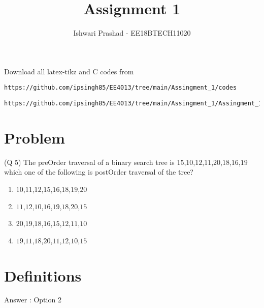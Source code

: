 \documentclass[journal,12pt,twocolumn]{IEEEtran}
\begin{document}
     \def\rightbox#1{\makebox[0in][r]{#1}}
     \def\centbox#1{\makebox[0in]{#1}}
     \def\topbox#1{\raisebox{-\baselineskip}[0in][0in]{#1}}
     \def\midbox#1{\raisebox{-0.5\baselineskip}[0in][0in]{#1}}
\vspace{3cm}
\title{Assignment 1}
\author{Ishwari Prashad - EE18BTECH11020}
\maketitle
\newpage
\bigskip
\renewcommand{\thefigure}{\theenumi}
\renewcommand{\thetable}{\theenumi}
Download all latex-tikz and C codes from 
%
\begin{lstlisting}
https://github.com/ipsingh85/EE4013/tree/main/Assingment_1/codes
\end{lstlisting}
\begin{lstlisting}
https://github.com/ipsingh85/EE4013/tree/main/Assingment_1/Assingment_1.tex
\end{lstlisting}
\section{Problem}
(Q 5) The preOrder traversal of a binary search tree is $15$,$10$,$12$,$11$,$20$,$18$,$16$,$19$ which one of the following is postOrder traversal of the tree?

\begin{enumerate}
    \item $10$,$11$,$12$,$15$,$16$,$18$,$19$,$20$
    \item $11$,$12$,$10$,$16$,$19$,$18$,$20$,$15$
    \item $20$,$19$,$18$,$16$,$15$,$12$,$11$,$10$
    \item $19$,$11$,$18$,$20$,$11$,$12$,$10$,$15$
\end{enumerate}
\section{Definitions}
Answer : Option 2
\end{document}
